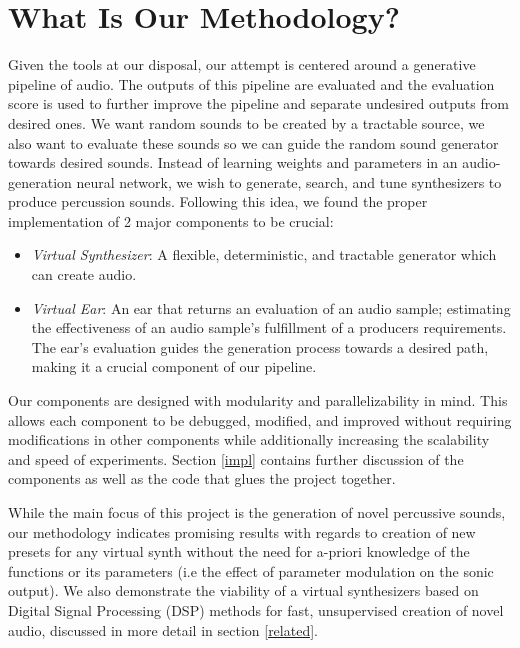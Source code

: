 \documentclass[\main/thesis.tex]{subfiles}
\begin{document}
\section{What Is Our Methodology?}
\label{sec_methodology}
Given the tools at our disposal, our attempt is centered around a generative pipeline of audio. The outputs of this pipeline are evaluated and the evaluation score is used to further improve the pipeline and separate undesired outputs from desired ones. We want random sounds to be created by a tractable source, we also want to evaluate these sounds so we can guide the random sound generator towards desired sounds. Instead of learning weights and parameters in an audio-generation neural network, we wish to generate, search, and tune synthesizers to produce percussion sounds. Following this idea, we found the proper implementation of 2 major components to be crucial:

\begin{itemize}
    \item \textit{Virtual Synthesizer}: A flexible, deter\-min\-istic, and tract\-able gener\-ator which can create audio. 
    \item \textit{Virtual Ear}: An ear that returns an evaluation of an audio sample; estimating the effectiveness of an audio sample's fulfillment of a producers requirements. The ear's evaluation guides the generation process towards a desired path, making it a crucial component of our pipeline. 
\end{itemize}
Our components are designed with modularity and parallelizability in mind. This allows each component to be debugged, modified, and improved without requiring modifications in other components while additionally increasing the scalability and speed of experiments. 
Section \ref{impl} contains further discussion of the components as well as the code that glues the project together.

While the main focus of this project is the generation of novel percussive sounds, our methodology indicates promising results with regards to creation of new presets for any virtual synth without the need for a-priori knowledge of the functions or its parameters (i.e the effect of parameter modulation on the sonic output). We also demonstrate the viability of a virtual synthesizers based on Digital Signal Processing (DSP) methods for fast, unsupervised creation of novel audio, discussed in more detail in section \ref{related}. 
\end{document}
